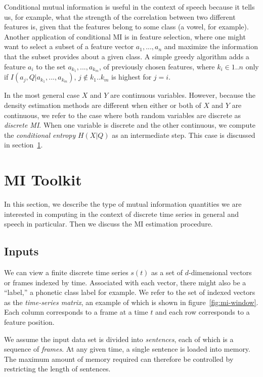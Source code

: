 \documentclass{article}
\begin{document}
Conditional mutual information is useful in the context of speech
because it tells us, for example, what the strength of the correlation
between two different features is, given that the features belong to
some class (a vowel, for example).  Another application of conditional
MI is in feature selection, where one might want to select a subset of
a feature vector ${a_1,...,a_{n}}$ and maximize the information that
the subset provides about a given class.  A simple greedy algorithm
adds a feature $a_i$ to the set ${a_{k_1},...,a_{k_m}}$, of previously
chosen features, where $k_i \in {1..n}$ only if
$I(a_j,Q|{a_{k_1},...,a_{k_m}})$, $j \notin {k_1..k_m}$ is highest for
$j=i$.

In the most general case $X$ and $Y$ are continuous variables.
However, because the density estimation methods are different when
either or both of $X$ and $Y$ are continuous, we refer to the case
where both random variables are discrete as {\it discrete MI}.  When
one variable is discrete and the other continuous, we compute the {\it
conditional entropy} $H(X|Q)$ as an intermediate step.  This case is
discussed in section~\ref{sec:toolkit}.

\section{MI Toolkit}
\label{sec:toolkit}

In this section, we describe the type of mutual information quantities
we are interested in computing in the context of discrete time series
in general and speech in particular.  Then we discuss the MI
estimation procedure.

\subsection{Inputs}
\label{sec:inputs}

We can view a finite discrete time series $s(t)$ as a set of
$d$-dimensional vectors or frames indexed by time.  Associated with
each vector, there might also be a ``label,'' a phonetic class label
for example.  We refer to the set of indexed vectors as the {\it
time-series matrix}, an example of which is shown in
figure~\ref{fig:mi-window}.  Each column corresponds to a frame at a
time $t$ and each row corresponds to a feature position.

We assume the input data set is divided into {\em sentences}, each of
which is a sequence of {\em frames}.  At any given time, a single
sentence is loaded into memory.  The maximum amount of memory required
can therefore be controlled by restricting the length of sentences.
\end{document}
